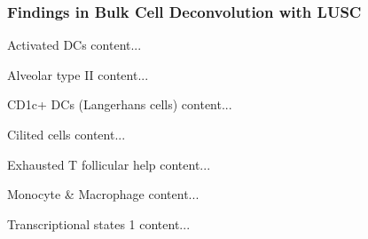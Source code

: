 \documentclass{beamer}
\begin{document}
    \begin{frame}[allowframebreaks]
        \frametitle{Findings in Bulk Cell Deconvolution with LUSC}

        \begin{block}{Activated DCs}
            content...
        \end{block}

        \begin{block}{Alveolar type II}
            content...
        \end{block}

        \begin{block}{CD1c+ DCs (Langerhans cells)}
            content...
        \end{block}

        \begin{block}{Cilited cells}
            content...
        \end{block}

        \begin{block}{Exhausted T follicular help}
            content...
        \end{block}

        \begin{block}{Monocyte \& Macrophage}
            content...
        \end{block}

        \begin{block}{Transcriptional states 1}
            content...
        \end{block}
    \end{frame}
\end{document}
